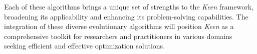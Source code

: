         Each of these algorithms brings a unique set of strengths to the \textit{Keen} framework, broadening its 
        applicability and enhancing its problem-solving capabilities. The integration of these diverse evolutionary 
        algorithms will position \textit{Keen} as a comprehensive toolkit for researchers and practitioners in various 
        domains seeking efficient and effective optimization solutions.
